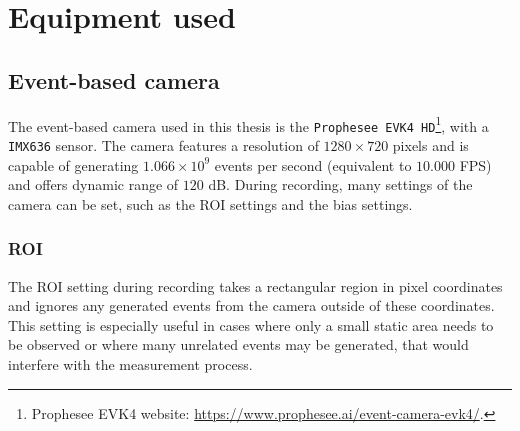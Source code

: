 \section{Equipment used}

\subsection{Event-based camera}
The event-based camera used in this thesis is the \texttt{Prophesee EVK4 HD}\footnote{Prophesee EVK4 website: \url{https://www.prophesee.ai/event-camera-evk4/}.},
with a \texttt{IMX636} sensor. The camera features a resolution of $1280 \times 720$ pixels and is capable of generating $1.066\times10^9$ events per second (equivalent to $10.000$ \ac{FPS}) and offers dynamic range of $120$ dB.
During recording, many settings of the camera can be set, such as the \ac{ROI} settings and the bias settings.

\subsubsection{ROI}
The \ac{ROI} setting during recording takes a rectangular region in pixel coordinates and ignores any generated events from the camera outside of
these coordinates. This setting is especially useful in cases where only a small static area needs to be observed or where many unrelated events
may be generated, that would interfere with the measurement process.

